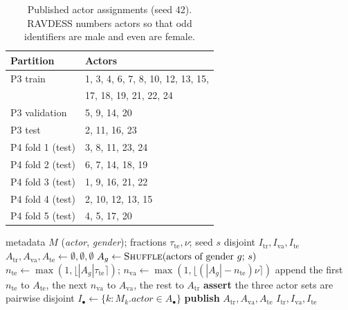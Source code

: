 \documentclass[journal,onecolumn,11pt,draftclsnofoot]{IEEEtran}   %
\begin{document}
\begin{table}[!t]
\centering\small
\caption{Published actor assignments (seed 42). RAVDESS numbers actors so that
odd identifiers are male and even are female.}
\label{tab:folds}
\begin{tabular}{@{}ll@{}}
\toprule
\textbf{Partition} & \textbf{Actors} \\
\midrule
P3 train      & 1, 3, 4, 6, 7, 8, 10, 12, 13, 15, \\
              & 17, 18, 19, 21, 22, 24 \\
P3 validation & 5, 9, 14, 20 \\
P3 test       & 2, 11, 16, 23 \\
\midrule
P4 fold 1 (test) & 3, 8, 11, 23, 24 \\
P4 fold 2 (test) & 6, 7, 14, 18, 19 \\
P4 fold 3 (test) & 1, 9, 16, 21, 22 \\
P4 fold 4 (test) & 2, 10, 12, 13, 15 \\
P4 fold 5 (test) & 4, 5, 17, 20 \\
\bottomrule
\end{tabular}
\end{table}

\begin{algorithm}[!t]
\caption{Gender-balanced speaker-disjoint partitioning}
\label{alg:split}
\begin{algorithmic}[1]
\Require metadata $M$ (\textit{actor}, \textit{gender}); fractions
         $\tau_{\mathrm{te}},\nu$; seed $s$
\Ensure disjoint $I_{\mathrm{tr}},I_{\mathrm{va}},I_{\mathrm{te}}$
\State $A_{\mathrm{tr}},A_{\mathrm{va}},A_{\mathrm{te}} \gets
       \emptyset,\emptyset,\emptyset$
  \State $A_g \gets \textsc{Shuffle}(\text{actors of gender } g;\, s)$
  \State $n_{\mathrm{te}} \gets \max(1,\lfloor |A_g|\tau_{\mathrm{te}}\rceil)$;\;
         $n_{\mathrm{va}} \gets \max(1,\lfloor (|A_g|-n_{\mathrm{te}})\nu\rceil)$
  \State append the first $n_{\mathrm{te}}$ to $A_{\mathrm{te}}$, the next
         $n_{\mathrm{va}}$ to $A_{\mathrm{va}}$, the rest to $A_{\mathrm{tr}}$
\EndFor
\State \textbf{assert} the three actor sets are pairwise disjoint
\State $I_\bullet \gets \{k : M_k.\textit{actor} \in A_\bullet\}$
\State \textbf{publish} $A_{\mathrm{tr}},A_{\mathrm{va}},A_{\mathrm{te}}$
\State \Return $I_{\mathrm{tr}},I_{\mathrm{va}},I_{\mathrm{te}}$
\end{algorithmic}
\end{algorithm}
\end{document}
